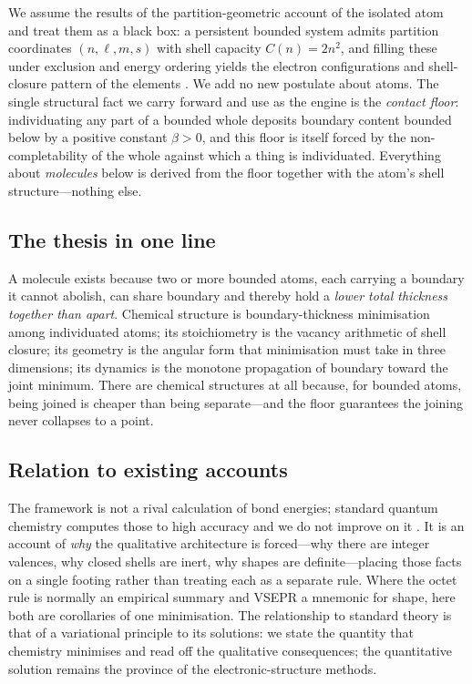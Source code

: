 \documentclass[11pt,twocolumn,a4paper]{article}
\theoremstyle{thmstyle}
\theoremstyle{definition}
\theoremstyle{remark}
\newcommand{\floorc}{\beta}
\newcommand{\Shellcap}{C}
\begin{document}
We assume the results of the partition-geometric account of the isolated
atom and treat them as a black box: a persistent bounded system admits
partition coordinates $(n,\ell,m,s)$ with shell capacity
$\Shellcap(n)=2n^{2}$, and filling these under exclusion and energy ordering
yields the electron configurations and shell-closure pattern of the
elements \citep{griffiths2018,pauli1925,madelung1936}. We add no new
postulate about atoms. The single structural fact we carry forward and
use as the engine is the \emph{contact floor}: individuating any part of
a bounded whole deposits boundary content bounded below by a positive
constant $\floorc>0$, and this floor is itself forced by the
non-completability of the whole against which a thing is
individuated. Everything about \emph{molecules} below is derived from
the floor together with the atom's shell structure---nothing else.

\subsection{The thesis in one line}

A molecule exists because two or more bounded atoms, each carrying a
boundary it cannot abolish, can share boundary and thereby hold a
\emph{lower total thickness together than apart}. Chemical structure is
boundary-thickness minimisation among individuated atoms; its
stoichiometry is the vacancy arithmetic of shell closure; its geometry is
the angular form that minimisation must take in three dimensions; its
dynamics is the monotone propagation of boundary toward the joint
minimum. There are chemical structures at all because, for bounded
atoms, being joined is cheaper than being separate---and the floor
guarantees the joining never collapses to a point.

\subsection{Relation to existing accounts}

The framework is not a rival calculation of bond energies; standard
quantum chemistry computes those to high accuracy and we do not improve
on it \citep{szabo1996,levine2014}. It is an account of \emph{why} the
qualitative architecture is forced---why there are integer valences, why
closed shells are inert, why shapes are definite---placing those facts on
a single footing rather than treating each as a separate rule. Where the
octet rule \citep{lewis1916,langmuir1919} is normally an empirical
summary and VSEPR \citep{gillespie1957} a mnemonic for shape, here both
are corollaries of one minimisation. The relationship to standard theory
is that of a variational principle to its solutions: we state the
quantity that chemistry minimises and read off the qualitative
consequences; the quantitative solution remains the province of the
electronic-structure methods.
\end{document}
